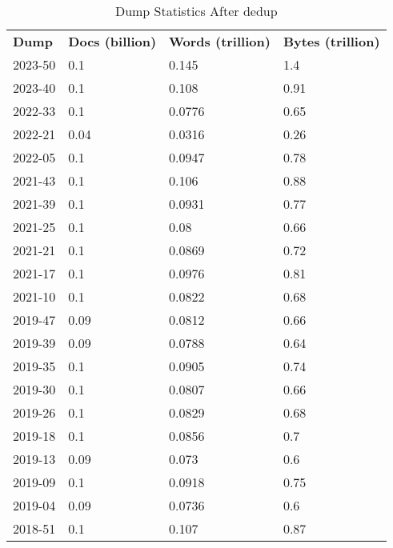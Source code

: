\begin{table}[]
\begin{tabular}{llll}
\textbf{Dump} & \textbf{Docs (billion)} & \textbf{Words (trillion)} & \textbf{Bytes (trillion)} \\
2023-50 & 0.1 & 0.145 & 1.4 \\
2023-40 & 0.1 & 0.108 & 0.91 \\
2022-33 & 0.1 & 0.0776 & 0.65 \\
2022-21 & 0.04 & 0.0316 & 0.26 \\
2022-05 & 0.1 & 0.0947 & 0.78 \\
2021-43 & 0.1 & 0.106 & 0.88 \\
2021-39 & 0.1 & 0.0931 & 0.77 \\
2021-25 & 0.1 & 0.08 & 0.66 \\
2021-21 & 0.1 & 0.0869 & 0.72 \\
2021-17 & 0.1 & 0.0976 & 0.81 \\
2021-10 & 0.1 & 0.0822 & 0.68 \\
2019-47 & 0.09 & 0.0812 & 0.66 \\
2019-39 & 0.09 & 0.0788 & 0.64 \\
2019-35 & 0.1 & 0.0905 & 0.74 \\
2019-30 & 0.1 & 0.0807 & 0.66 \\
2019-26 & 0.1 & 0.0829 & 0.68 \\
2019-18 & 0.1 & 0.0856 & 0.7 \\
2019-13 & 0.09 & 0.073 & 0.6 \\
2019-09 & 0.1 & 0.0918 & 0.75 \\
2019-04 & 0.09 & 0.0736 & 0.6 \\
2018-51 & 0.1 & 0.107 & 0.87 \\
\end{tabular}
\caption{Dump Statistics After dedup}
\label{table:1}
\end{table}